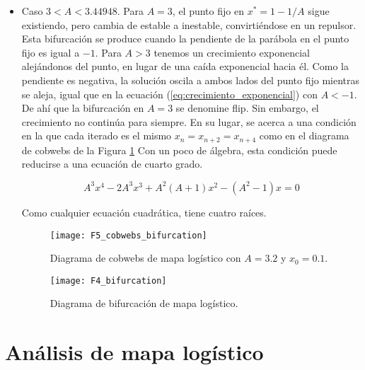\begin{itemize}
            \item Caso $3 < A < 3.44948$.
                Para $A = 3$, el punto fijo en $x^{*} = 1 - 1/A$ sigue existiendo, pero cambia de estable a inestable, convirtiéndose en un repulsor. Esta bifurcación se produce cuando la pendiente de la parábola en el punto fijo es igual a $-1$. Para $A > 3$ tenemos un crecimiento exponencial alejándonos del punto, en lugar de una caída exponencial hacia él. Como la pendiente es negativa, la solución oscila a ambos lados del punto fijo mientras se aleja, igual que en la ecuación (\ref{eq:crecimiento_exponencial}) con $ A < -1$. De ahí que la bifurcación en $A = 3$ se denomine flip. Sin embargo, el crecimiento no continúa para siempre. En su lugar, se acerca a una condición en la que cada iterado es el mismo $x_{n} = x_{n+2} = x_{n+4}$ como en el diagrama de cobwebs de la Figura \ref{fig:F5_cobwebs_bifurcation} Con un poco de álgebra, esta condición puede reducirse a una ecuación de cuarto grado.

                \begin{equation}
                    A^{3} x^{4} - 2 A^{3} x^{3} + A^{2} (A + 1) x^{2} - (A^{2} -1)x = 0
                \end{equation}

                Como cualquier ecuación cuadrática, tiene cuatro raíces. 


                


        \begin{figure}[hbtp]
            \caption{Diagrama de cobwebs de mapa logístico con $A = 3.2$ y $x_{0} = 0.1$.}
            \centering
            \texttt{[image: F5\_cobwebs\_bifurcation]}
            \label{fig:F5_cobwebs_bifurcation}
        \end{figure}


        \begin{figure}[hbtp]
            \caption{Diagrama de bifurcación de mapa logístico.}
            \centering
            \texttt{[image: F4\_bifurcation]}
            \label{fig:F4_bifurcation}
        \end{figure}


        \end{itemize}

    \section{Análisis de mapa logístico}

